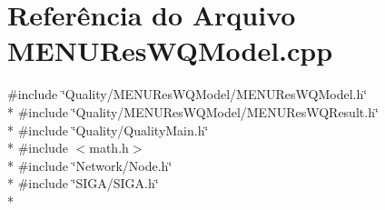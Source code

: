 \section{Referência do Arquivo M\+E\+N\+U\+Res\+W\+Q\+Model.\+cpp}
\label{_m_e_n_u_res_w_q_model_8cpp}
{\ttfamily \#include \char`\"{}Quality/\+M\+E\+N\+U\+Res\+W\+Q\+Model/\+M\+E\+N\+U\+Res\+W\+Q\+Model.\+h\char`\"{}}\\*
{\ttfamily \#include \char`\"{}Quality/\+M\+E\+N\+U\+Res\+W\+Q\+Model/\+M\+E\+N\+U\+Res\+W\+Q\+Result.\+h\char`\"{}}\\*
{\ttfamily \#include \char`\"{}Quality/\+Quality\+Main.\+h\char`\"{}}\\*
{\ttfamily \#include $<$math.\+h$>$}\\*
{\ttfamily \#include \char`\"{}Network/\+Node.\+h\char`\"{}}\\*
{\ttfamily \#include \char`\"{}S\+I\+G\+A/\+S\+I\+G\+A.\+h\char`\"{}}\\*
